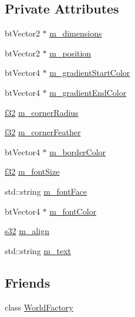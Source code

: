\subsection*{Private Attributes}
\begin{DoxyCompactItemize}
\item 
bt\+Vector2 $\ast$ \mbox{\hyperlink{classnjli_1_1_textbox_h_u_d_a3fdbfd3f2db11b4a118fdc82a7bc1c82}{m\+\_\+dimensions}}
\item 
bt\+Vector2 $\ast$ \mbox{\hyperlink{classnjli_1_1_textbox_h_u_d_a27b131699bb7dcf4fc947bd6b00bb7a1}{m\+\_\+position}}
\item 
bt\+Vector4 $\ast$ \mbox{\hyperlink{classnjli_1_1_textbox_h_u_d_a380d4290dada0dc4d473607232c40583}{m\+\_\+gradient\+Start\+Color}}
\item 
bt\+Vector4 $\ast$ \mbox{\hyperlink{classnjli_1_1_textbox_h_u_d_a858485f108bca319bc515277ed761b36}{m\+\_\+gradient\+End\+Color}}
\item 
\mbox{\hyperlink{_util_8h_a5f6906312a689f27d70e9d086649d3fd}{f32}} \mbox{\hyperlink{classnjli_1_1_textbox_h_u_d_a48c6372c4c026a947fab4171e35a4e0c}{m\+\_\+corner\+Radius}}
\item 
\mbox{\hyperlink{_util_8h_a5f6906312a689f27d70e9d086649d3fd}{f32}} \mbox{\hyperlink{classnjli_1_1_textbox_h_u_d_ab28ef6131914c9b7a70c546ab8f8f4e9}{m\+\_\+corner\+Feather}}
\item 
bt\+Vector4 $\ast$ \mbox{\hyperlink{classnjli_1_1_textbox_h_u_d_aec80fd8dffdf0020e7c87cee649627ad}{m\+\_\+border\+Color}}
\item 
\mbox{\hyperlink{_util_8h_a5f6906312a689f27d70e9d086649d3fd}{f32}} \mbox{\hyperlink{classnjli_1_1_textbox_h_u_d_a01079b7367a5e9e86893c53ec5db32d1}{m\+\_\+font\+Size}}
\item 
std\+::string \mbox{\hyperlink{classnjli_1_1_textbox_h_u_d_a424e4e0af8b1edca7a9c25987e83ea1f}{m\+\_\+font\+Face}}
\item 
bt\+Vector4 $\ast$ \mbox{\hyperlink{classnjli_1_1_textbox_h_u_d_a92f502e47b78d0ad705d2c38d657e2df}{m\+\_\+font\+Color}}
\item 
\mbox{\hyperlink{_util_8h_aa62c75d314a0d1f37f79c4b73b2292e2}{s32}} \mbox{\hyperlink{classnjli_1_1_textbox_h_u_d_a1bbc7f330620b73ffb42494271a304d8}{m\+\_\+align}}
\item 
std\+::string \mbox{\hyperlink{classnjli_1_1_textbox_h_u_d_a60d9bc72cf0a7f5307dc3a65f6b15a6c}{m\+\_\+text}}
\end{DoxyCompactItemize}
\subsection*{Friends}
\begin{DoxyCompactItemize}
\item 
class \mbox{\hyperlink{classnjli_1_1_textbox_h_u_d_acb96ebb09abe8f2a37a915a842babfac}{World\+Factory}}
\end{DoxyCompactItemize}


